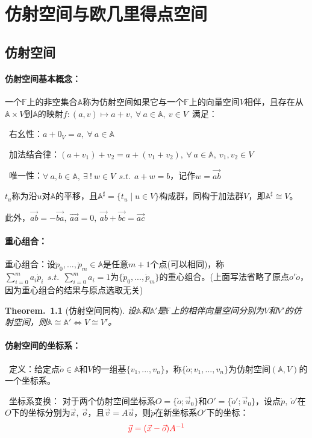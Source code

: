 \documentclass[zihao=5,UTF8]{report}
\def\F{\mathbb{F}}
\def\A{\mathbb{A}}
\theoremstyle{mystyle} %
\newtheorem{theorem}{Theorem.\,}
\begin{document}
\chapter{仿射空间与欧几里得点空间}

\section{仿射空间}
\subsubsection{仿射空间基本概念：}
一个$\F$上的非空集合$\A$称为仿射空间如果它与一个$\F$上的向量空间$V$相伴，且存在从$\A\times V$到$\A$的映射$f:(a,v) \longmapsto a+v,\ \forall\ a\in \A,\ v\in V$\ 满足：
\par{}\ 右幺性：$a+0_{V} = a,\ \forall\ a\in \A$\par
{}\  加法结合律：$(a+v_1)+v_2 = a+(v_1+v_2),\ \forall\ a\in \A,\ v_1,v_2\in V$   \par
{}\  唯一性：$\forall\ a,b\in \A,\ \exists\ !\ w \in V\ \ s.t.\ \ a+w=b$，记作$w = \overrightarrow{ab}  $ \par

$t_u$称为沿$u$对$\A$的平移，且$\A^{\sharp } = \{t_u\mid u\in V\}$构成群，同构于加法群$V$，即$\A^{\sharp } \cong V$。

此外，$\overrightarrow{ab} = -\overrightarrow{ba},\ \overrightarrow{aa}=0,\  \overrightarrow{ab}+ \overrightarrow{bc} =  \overrightarrow{ac}$

\subsubsection{重心组合：}
重心组合：设$\dot{p}_0,...,\dot{p}_m \in \A$是任意$m+1$个点(可以相同)，称$\sum_{i=0}^{m}a_i\dot{p}_i\ \ s.t.\ \ \sum_{i=0}^{m}a_i = 1  $为$\{\dot{p}_0,...,\dot{p}_m \}$的重心组合。(上面写法省略了原点$o'\dot{o}$，因为重心组合的结果与原点选取无关) 

\begin{theorem}[仿射空间同构]\label{仿射空间同构}
设$\A$和$\A'$是$\F$上的相伴向量空间分别为$V$和$V'$的仿射空间，则$\A\cong\A' \Longleftrightarrow V \cong V' $。
\end{theorem}


\subsubsection{仿射空间的坐标系：}
\par{}\ 定义：给定点$\dot{o}\in \A$和$V$的一组基$\{v_1,...,v_n\}$，称$\{\dot{o};v_1,...,v_n\}$为仿射空间$(\A,V)$的一个坐标系。
\par
{}\  坐标系变换： 
对于两个仿射空间坐标系$O = \{\dot{o};\vec{u}_0\}$和$O' = \{\dot{o}';\vec{v}_0\}$，设点$\dot{p},\ \dot{o}'$在$O$下的坐标分别为$\vec{x},\ \vec{o}$，且$\vec{v} = A\vec{u}$，则$\dot{p}$在新坐标系$O'$下的坐标：
\begin{equation*}
    \textcolor{red}{\vec{y} = (\vec{x} - \vec{o})A^{-1}}
\end{equation*}
\par
\end{document}
